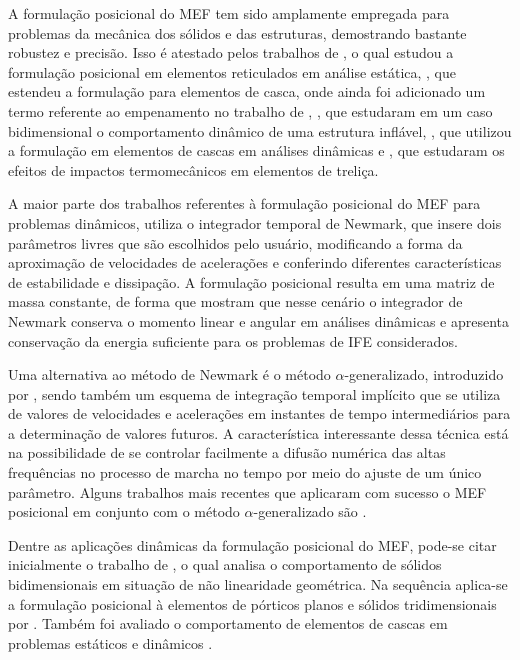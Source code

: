 A formulação posicional do MEF tem sido amplamente empregada para problemas da mecânica dos sólidos e das estruturas, demostrando bastante robustez e precisão. Isso é atestado pelos trabalhos de , o qual estudou a formulação posicional em elementos reticulados em análise estática, , que estendeu a formulação para elementos de casca, onde ainda foi adicionado um termo referente ao empenamento no trabalho de , , que estudaram em um caso bidimensional o comportamento dinâmico de uma estrutura inflável, , que utilizou a formulação em elementos de cascas em análises dinâmicas e , que estudaram os efeitos de impactos termomecânicos em elementos de treliça.

A maior parte dos trabalhos referentes à formulação posicional do MEF para problemas dinâmicos, utiliza o integrador temporal de Newmark, que insere dois parâmetros livres que são escolhidos pelo usuário, modificando a forma da aproximação de velocidades de acelerações e conferindo diferentes características de estabilidade e dissipação. A formulação posicional resulta em uma matriz de massa constante, de forma que  mostram que nesse cenário o integrador de Newmark conserva o momento linear e angular em análises dinâmicas e apresenta conservação da energia suficiente para os problemas de IFE considerados.

Uma alternativa ao método de Newmark é o método $\alpha$-generalizado, introduzido por , sendo também um esquema de integração temporal implícito que se utiliza de valores de velocidades e acelerações em instantes de tempo intermediários para a determinação de valores futuros. A característica interessante dessa técnica está na possibilidade de se controlar facilmente a difusão numérica das altas frequências no processo de marcha no tempo por meio do ajuste de um único parâmetro. Alguns trabalhos mais recentes que aplicaram com sucesso o MEF posicional em conjunto com o método $\alpha$-generalizado são .

Dentre as aplicações dinâmicas da formulação posicional do MEF, pode-se citar inicialmente o trabalho de , o qual analisa o comportamento de sólidos bidimensionais em situação de não linearidade geométrica. Na sequência aplica-se a formulação posicional à elementos de pórticos planos e sólidos tridimensionais por . Também foi avaliado o comportamento de elementos de cascas em problemas estáticos \cite{coda2007alternative} e dinâmicos \cite{coda2009unconstrained}.

